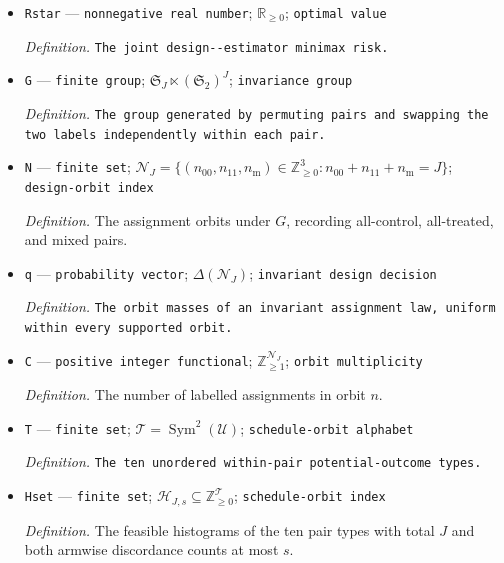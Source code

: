 \documentclass{article}
\begin{document}
\begin{itemize}
  \par\smallskip\noindent\emph{Definition.} \texttt{The randomization mean-\allowbreak{}squared error at a fixed schedule.}
  \item \texttt{Rstar} --- \texttt{nonnegative real number}; \(\mathbb R_{\ge0}\); \texttt{optimal value}
  \par\smallskip\noindent\emph{Definition.} \texttt{The joint design-\allowbreak{}-\allowbreak{}estimator minimax risk.}
  \item \texttt{G} --- \texttt{finite group}; \(\mathfrak S_J\ltimes(\mathfrak S_2)^J\); \texttt{invariance group}
  \par\smallskip\noindent\emph{Definition.} \texttt{The group generated by permuting pairs and swapping the two labels independently within each pair.}
  \item \texttt{N} --- \texttt{finite set}; \(\mathcal N_J=\{(n_{00},n_{11},n_{\mathrm m})\in\mathbb Z_{\ge0}^3:n_{00}+n_{11}+n_{\mathrm m}=J\}\); \texttt{design-\allowbreak{}orbit index}
  \par\smallskip\noindent\emph{Definition.} The assignment orbits under \(G\), recording all-control, all-treated, and mixed pairs.
  \item \texttt{q} --- \texttt{probability vector}; \(\Delta(\mathcal N_J)\); \texttt{invariant design decision}
  \par\smallskip\noindent\emph{Definition.} \texttt{The orbit masses of an invariant assignment law,\allowbreak{} uniform within every supported orbit.}
  \item \texttt{C} --- \texttt{positive integer functional}; \(\mathbb Z_{\ge1}^{\mathcal N_J}\); \texttt{orbit multiplicity}
  \par\smallskip\noindent\emph{Definition.} The number of labelled assignments in orbit \(n\).
  \item \texttt{T} --- \texttt{finite set}; \(\mathcal T=\operatorname{Sym}^2(\mathcal U)\); \texttt{schedule-\allowbreak{}orbit alphabet}
  \par\smallskip\noindent\emph{Definition.} \texttt{The ten unordered within-\allowbreak{}pair potential-\allowbreak{}outcome types.}
  \item \texttt{Hset} --- \texttt{finite set}; \(\mathcal H_{J,s}\subseteq\mathbb Z_{\ge0}^{\mathcal T}\); \texttt{schedule-\allowbreak{}orbit index}
  \par\smallskip\noindent\emph{Definition.} The feasible histograms of the ten pair types with total \(J\) and both armwise discordance counts at most \(s\).

\end{itemize}
\end{document}
